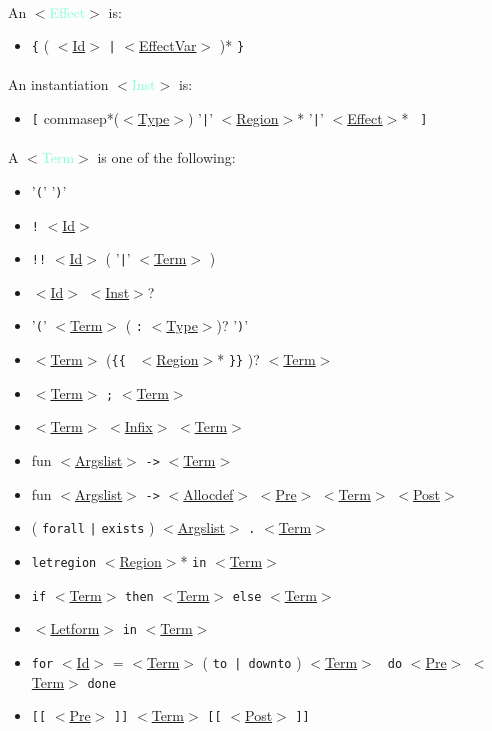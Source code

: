 \documentclass[a4paper]{scrreprt}
\newcommand{\cat}[1]{$<$\hyperref[#1]{#1}$>$}
\newcommand{\catdef}[1]{\label{#1}$<$\textcolor{Aquamarine}{#1}$>$}
\begin{document}
\paragraph{}
An \catdef{Effect} is: 
\begin{itemize}
  \item {\tt \{} ( \cat{Id} {\tt |} \cat{EffectVar} )* {\tt \}}
\end{itemize}

\paragraph{}
An instantiation \catdef{Inst} is:
\begin{itemize}
  \item {\tt [} commasep*(\cat{Type}) '{\tt |}' \cat{Region}* '{\tt |}' \cat{Effect}* {\tt
    ]}
\end{itemize}
  

\paragraph{}
A \catdef{Term} is one of the following:
\begin{itemize}
  \item '{\tt (}' '{\tt )}'
  \item {\tt !} \cat{Id}
  \item {\tt !!} \cat{Id} ( '{\tt |}' \cat{Term} )
  \item \cat{Id} \cat{Inst}?
  \item '{\tt (}' \cat{Term} ( {\tt :} \cat{Type})? '{\tt )}'
  \item \cat{Term} ({\tt \{\{ } \cat{Region}* {\tt \}\}} )? \cat{Term} 
  \item \cat{Term} {\tt ;} \cat{Term} 
  \item \cat{Term} \cat{Infix} \cat{Term}
  \item fun \cat{Argslist} {\tt ->} \cat{Term}
  \item fun \cat{Argslist} {\tt ->} \cat{Allocdef} {\cat{Pre}} \cat{Term} {\cat{Post}}
  \item ( {\tt forall} {\tt |} {\tt exists} ) \cat{Argslist} {\tt .} \cat{Term}
  \item {\tt letregion} \cat{Region}* {\tt in} \cat{Term}
  \item {\tt if} \cat{Term} {\tt then} \cat{Term} {\tt else} \cat{Term}
  \item \cat{Letform} {\tt in} \cat{Term}
  \item {\tt for} \cat{Id} = \cat{Term} ( {\tt to | downto} ) \cat{Term} {\tt
    do} {\cat{Pre}} \cat{Term} {\tt done}
  \item {\tt [[} \cat{Pre} {\tt ]]} \cat{Term} {\tt [[} \cat{Post} {\tt ]]}
\end{itemize}
\end{document}
